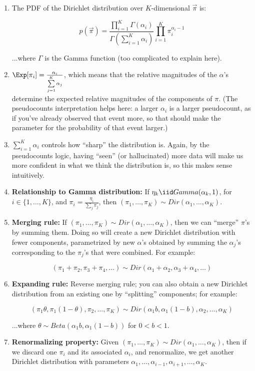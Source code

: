\begin{enumerate}
\item The PDF of the Dirichlet distribution over $K$-dimensional $\vec{\pi}$ is:

$$p(\vec{\pi}) = \frac{\prod\limits_{i = 1}^K \Gamma(\alpha_i)}{\Gamma\left(\sum\limits_{i = 1}^K \alpha_i\right)} \prod\limits_{i = 1}^K \pi_i^{\alpha_i - 1}$$

...where $\Gamma$ is the Gamma function (too complicated to explain here).

\item $\Exp[\pi_i] = \frac{\alpha_i}{\sum\limits_{j = 1}^K \alpha_j}$, which means that the relative magnitudes of the $\alpha$'s determine the expected relative magnitudes of the components of $\pi$. (The pseudocounts interpretation helps here: a larger $\alpha_i$ is a larger pseudocount, as if you've already observed that event more, so that should make the parameter for the probability of that event larger.)

\item $\sum_{i = 1}^K \alpha_i$ controls how ``sharp'' the distribution is. Again, by the pseudocounts logic, having ``seen'' (or hallucinated) more data will make us more confident in what we think the distribution is, so this makes sense intuitively.

\item \textbf{Relationship to Gamma distribution:} If $\eta_k \iid Gamma(\alpha_k, 1)$, for $i \in \{1, \ldots, K\}$, and $\pi_i = \frac{\eta_i}{\sum_j \pi_j}$, then $(\pi_1, \ldots, \pi_K) \sim Dir(\alpha_1, \ldots, \alpha_K)$.

\newpage
\item \textbf{Merging rule:} If $(\pi_1, \ldots, \pi_K) \sim Dir(\alpha_1, \ldots, \alpha_K)$, then we can ``merge'' $\pi$'s by summing them. Doing so will create a new Dirichlet distribution with fewer components, parametrized by new $\alpha$'s obtained by summing the $\alpha_j$'s corresponding to the $\pi_j$'s that were combined. For example:

$$(\pi_1 + \pi_2, \pi_3 + \pi_4, \ldots) \sim Dir(\alpha_1 + \alpha_2, \alpha_3 + \alpha_4, \ldots)$$

\item \textbf{Expanding rule:} Reverse merging rule; you can also obtain a new Dirichlet distribution from an existing one by ``splitting'' components; for example:

$$(\pi_1\theta, \pi_1(1-\theta), \pi_2, \ldots, \pi_K) \sim Dir(\alpha_1b,\alpha_1(1-b),\alpha_2, \ldots, \alpha_K)$$

...where $\theta \sim Beta(\alpha_1b, \alpha_1(1-b))$  for $0< b <1$. 

\item \textbf{Renormalizing property:} Given $(\pi_1, \ldots, \pi_K) \sim Dir(\alpha_1, \ldots, \alpha_K)$, then if we discard one $\pi_i$ and its associated $\alpha_i$, and renormalize, we get another Dirichlet distribution with parameters $\alpha_1, \ldots, \alpha_{i - 1}, \alpha_{i + 1}, \ldots, \alpha_K$.
\end{enumerate}

